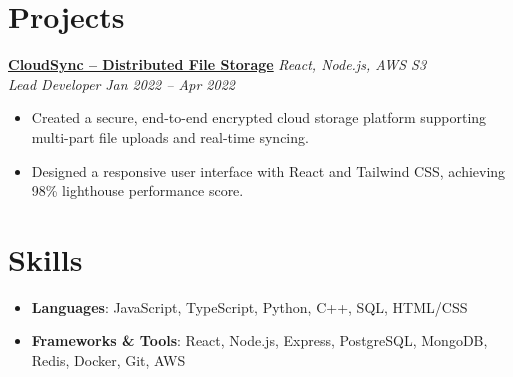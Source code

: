 \documentclass[11pt]{article}
\begin{document}
\section{Projects}
\noindent\textbf{\href{https://github.com/alexmorgan/cloud-sync}{CloudSync -- Distributed File Storage}} \hfill \textit{React, Node.js, AWS S3}\\
\textit{Lead Developer} \hfill \textit{Jan 2022 -- Apr 2022}\vspace{-2pt}
\begin{itemize}
  \item Created a secure, end-to-end encrypted cloud storage platform supporting multi-part file uploads and real-time syncing.
  \item Designed a responsive user interface with React and Tailwind CSS, achieving 98\% lighthouse performance score.
\end{itemize}

\section{Skills}
\begin{itemize}[leftmargin=0.15in, label={}]
  \item \textbf{Languages}{: JavaScript, TypeScript, Python, C++, SQL, HTML/CSS}
  \item \textbf{Frameworks \& Tools}{: React, Node.js, Express, PostgreSQL, MongoDB, Redis, Docker, Git, AWS}
\end{itemize}
\end{document}
